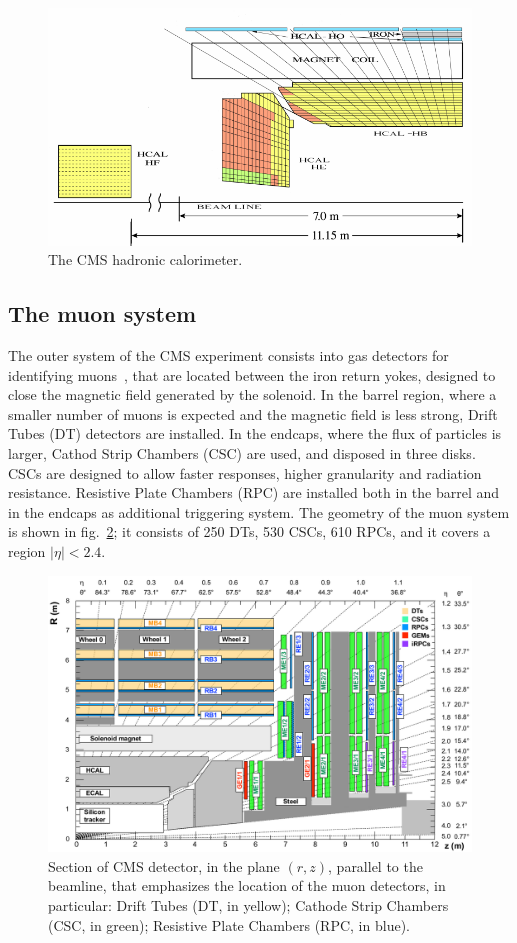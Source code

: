 \begin{figure}[!htb]
  \centering
    \includegraphics[width=.7\textwidth]{figures/cmshcal.png}
  \caption{The CMS hadronic calorimeter.}
  \label{fig:CMS_hcal}
\end{figure}


\subsection{The muon system}


The outer system of the CMS experiment consists into gas detectors for identifying muons~\cite{MUON-TDR}, that are located between the iron return yokes, designed to close the magnetic field generated by the solenoid. In the barrel region, where a smaller number of muons is expected and the magnetic field is less strong, Drift Tubes (DT) detectors are installed. In the endcaps, where the flux of particles is larger, Cathod Strip Chambers (CSC) are used, and disposed in three disks. CSCs are designed to allow faster responses, higher granularity and radiation resistance. Resistive Plate Chambers (RPC) are installed both in the barrel and in the endcaps as additional triggering system. The geometry of the muon system is shown in fig.~\ref{fig:CMS_muon}; it consists of 250 DTs, 530 CSCs, 610 RPCs, and it covers a region $|\eta|<2.4$.

\begin{figure}[!htb]
  \centering
    \includegraphics[width=.9\textwidth]{figures/cmsmuon.png}
  \caption{Section of CMS detector, in the plane $(r,z)$, parallel to the beamline, that emphasizes the location of the muon detectors, in particular: Drift Tubes (DT, in yellow); Cathode Strip Chambers (CSC, in green); Resistive Plate Chambers (RPC, in blue).}
  \label{fig:CMS_muon}
\end{figure}


